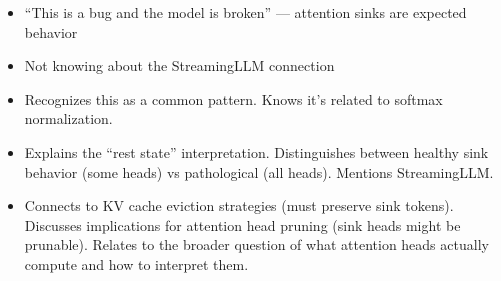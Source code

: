 \begin{interviewq}
\redflags
\begin{itemize}
    \item ``This is a bug and the model is broken'' --- attention sinks are expected behavior
    \item Not knowing about the StreamingLLM connection
\end{itemize}


\goodgreat
\begin{itemize}
    \item {} Recognizes this as a common pattern. Knows it's related to softmax normalization.
    \item {} Explains the ``rest state'' interpretation. Distinguishes between healthy sink behavior (some heads) vs pathological (all heads). Mentions StreamingLLM.
    \item {} Connects to KV cache eviction strategies (must preserve sink tokens). Discusses implications for attention head pruning (sink heads might be prunable). Relates to the broader question of what attention heads actually compute and how to interpret them.
\end{itemize}

\end{interviewq}

